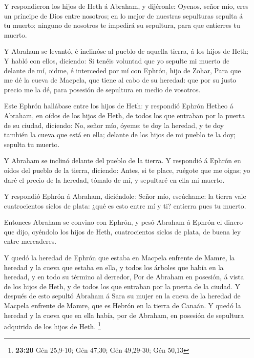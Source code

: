  Y respondieron los hijos de Heth á Abraham, y dijéronle:
 Oyenos, señor mío, eres un príncipe de Dios entre nosotros;
en lo mejor de nuestras sepulturas sepulta á tu muerto; ninguno de
nosotros te impedirá su sepultura, para que entierres tu muerto.

 Y Abraham se levantó, é inclinóse al pueblo de aquella
tierra, á los hijos de Heth;  Y habló con ellos, diciendo:
Si tenéis voluntad que yo sepulte mi muerto de delante de mí, oidme, é
interceded por mí con Ephrón, hijo de Zohar,  Para que me dé
la cueva de Macpela, que tiene al cabo de su heredad: que por su justo
precio me la dé, para posesión de sepultura en medio de vosotros.

 Este Ephrón hallábase entre los hijos de Heth: y respondió
Ephrón Hetheo á Abraham, en oídos de los hijos de Heth, de todos los que
entraban por la puerta de su ciudad, diciendo:  No, señor
mío, óyeme: te doy la heredad, y te doy también la cueva que está en
ella; delante de los hijos de mi pueblo te la doy; sepulta tu muerto.

 Y Abraham se inclinó delante del pueblo de la tierra.
 Y respondió á Ephrón en oídos del pueblo de la tierra,
diciendo: Antes, si te place, ruégote que me oigas; yo daré el precio de
la heredad, tómalo de mí, y sepultaré en ella mi muerto.

 Y respondió Ephrón á Abraham, diciéndole: 
Señor mío, escúchame: la tierra vale cuatrocientos siclos de plata: ¿qué
es esto entre mí y ti? entierra pues tu muerto.

 Entonces Abraham se convino con Ephrón, y pesó Abraham á
Ephrón el dinero que dijo, oyéndolo los hijos de Heth, cuatrocientos
siclos de plata, de buena ley entre mercaderes.

 Y quedó la heredad de Ephrón que estaba en Macpela
enfrente de Mamre, la heredad y la cueva que estaba en ella, y todos los
árboles que había en la heredad, y en todo su término al derredor,
 Por de Abraham en posesión, á vista de los hijos de Heth,
y de todos los que entraban por la puerta de la ciudad.  Y
después de esto sepultó Abraham á Sara su mujer en la cueva de la
heredad de Macpela enfrente de Mamre, que es Hebrón en la tierra de
Canaán.  Y quedó la heredad y la cueva que en ella había,
por de Abraham, en posesión de sepultura adquirida de los hijos de Heth.
\footnote{\textbf{23:20} Gén 25,9-10; Gén 47,30; Gén 49,29-30; Gén 50,13}

